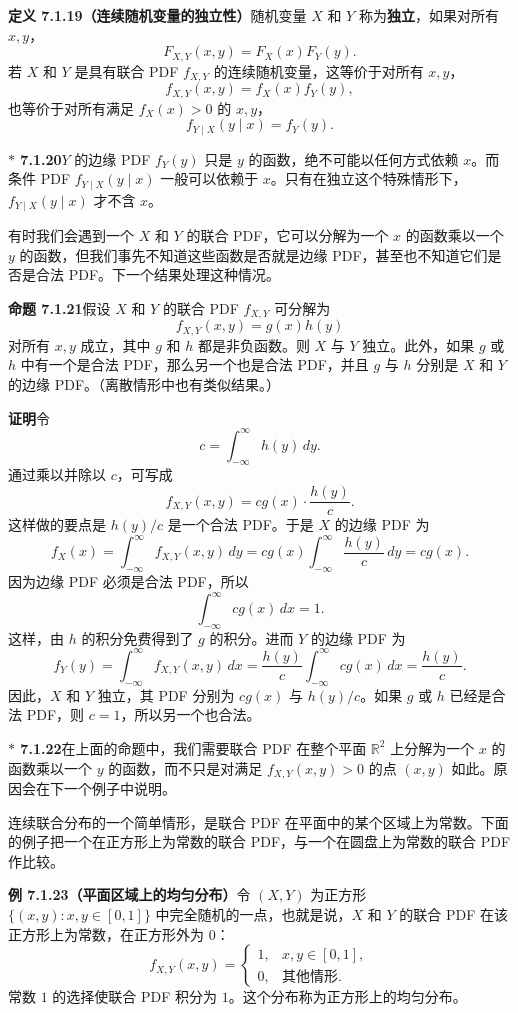 \documentclass[UTF8,12pt,a4paper,fontset=fandol]{ctexart}
\newcommand{\biohazard}{\ensuremath{\ast}}
\begin{document}
\noindent\textbf{定义 7.1.19（连续随机变量的独立性）}\quad 随机变量 $X$ 和 $Y$ 称为\textbf{独立}，如果对所有 $x,y$，
\[
  F_{X,Y}(x,y)=F_X(x)F_Y(y).
\]
若 $X$ 和 $Y$ 是具有联合 PDF $f_{X,Y}$ 的连续随机变量，这等价于对所有 $x,y$，
\[
  f_{X,Y}(x,y)=f_X(x)f_Y(y),
\]
也等价于对所有满足 $f_X(x)>0$ 的 $x,y$，
\[
  f_{Y\mid X}(y\mid x)=f_Y(y).
\]

\noindent\textbf{$\biohazard$ 7.1.20}\quad $Y$ 的边缘 PDF $f_Y(y)$ 只是 $y$ 的函数，绝不可能以任何方式依赖 $x$。而条件 PDF $f_{Y\mid X}(y\mid x)$ 一般可以依赖于 $x$。只有在独立这个特殊情形下，$f_{Y\mid X}(y\mid x)$ 才不含 $x$。

有时我们会遇到一个 $X$ 和 $Y$ 的联合 PDF，它可以分解为一个 $x$ 的函数乘以一个 $y$ 的函数，但我们事先不知道这些函数是否就是边缘 PDF，甚至也不知道它们是否是合法 PDF。下一个结果处理这种情况。

\noindent\textbf{命题 7.1.21}\quad 假设 $X$ 和 $Y$ 的联合 PDF $f_{X,Y}$ 可分解为
\[
  f_{X,Y}(x,y)=g(x)h(y)
\]
对所有 $x,y$ 成立，其中 $g$ 和 $h$ 都是非负函数。则 $X$ 与 $Y$ 独立。此外，如果 $g$ 或 $h$ 中有一个是合法 PDF，那么另一个也是合法 PDF，并且 $g$ 与 $h$ 分别是 $X$ 和 $Y$ 的边缘 PDF。（离散情形中也有类似结果。）

\noindent\textbf{证明}\quad 令
\[
  c=\int_{-\infty}^{\infty}h(y)\,dy.
\]
通过乘以并除以 $c$，可写成
\[
  f_{X,Y}(x,y)=c g(x)\cdot \frac{h(y)}{c}.
\]
这样做的要点是 $h(y)/c$ 是一个合法 PDF。于是 $X$ 的边缘 PDF 为
\[
  f_X(x)=\int_{-\infty}^{\infty} f_{X,Y}(x,y)\,dy
  =c g(x)\int_{-\infty}^{\infty}\frac{h(y)}{c}\,dy
  =c g(x).
\]
因为边缘 PDF 必须是合法 PDF，所以
\[
  \int_{-\infty}^{\infty} c g(x)\,dx=1.
\]
这样，由 $h$ 的积分免费得到了 $g$ 的积分。进而 $Y$ 的边缘 PDF 为
\[
  f_Y(y)=\int_{-\infty}^{\infty} f_{X,Y}(x,y)\,dx
  =\frac{h(y)}{c}\int_{-\infty}^{\infty}c g(x)\,dx
  =\frac{h(y)}{c}.
\]
因此，$X$ 和 $Y$ 独立，其 PDF 分别为 $c g(x)$ 与 $h(y)/c$。如果 $g$ 或 $h$ 已经是合法 PDF，则 $c=1$，所以另一个也合法。

\noindent\textbf{$\biohazard$ 7.1.22}\quad 在上面的命题中，我们需要联合 PDF 在整个平面 $\mathbb{R}^2$ 上分解为一个 $x$ 的函数乘以一个 $y$ 的函数，而不只是对满足 $f_{X,Y}(x,y)>0$ 的点 $(x,y)$ 如此。原因会在下一个例子中说明。

连续联合分布的一个简单情形，是联合 PDF 在平面中的某个区域上为常数。下面的例子把一个在正方形上为常数的联合 PDF，与一个在圆盘上为常数的联合 PDF 作比较。

\noindent\textbf{例 7.1.23（平面区域上的均匀分布）}\quad 令 $(X,Y)$ 为正方形 $\{(x,y):x,y\in[0,1]\}$ 中完全随机的一点，也就是说，$X$ 和 $Y$ 的联合 PDF 在该正方形上为常数，在正方形外为 $0$：
\[
  f_{X,Y}(x,y)=
  \begin{cases}
    1, & x,y\in[0,1],\\
    0, & \text{其他情形}.
  \end{cases}
\]
常数 $1$ 的选择使联合 PDF 积分为 $1$。这个分布称为正方形上的均匀分布。
\end{document}
